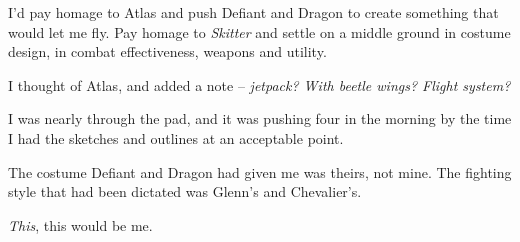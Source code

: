 I'd pay homage to Atlas and push Defiant and Dragon to create something that would let me fly.  Pay homage to \emph{Skitter }and settle on a middle ground in costume design, in combat effectiveness, weapons and utility.



I thought of Atlas, and added a note – \emph{jetpack?  With beetle wings?  Flight system?}



I was nearly through the pad, and it was pushing four in the morning by the time I had the sketches and outlines at an acceptable point.



The costume Defiant and Dragon had given me was theirs, not mine.  The fighting style that had been dictated was Glenn's and Chevalier's.



\emph{This}, this would be me.





